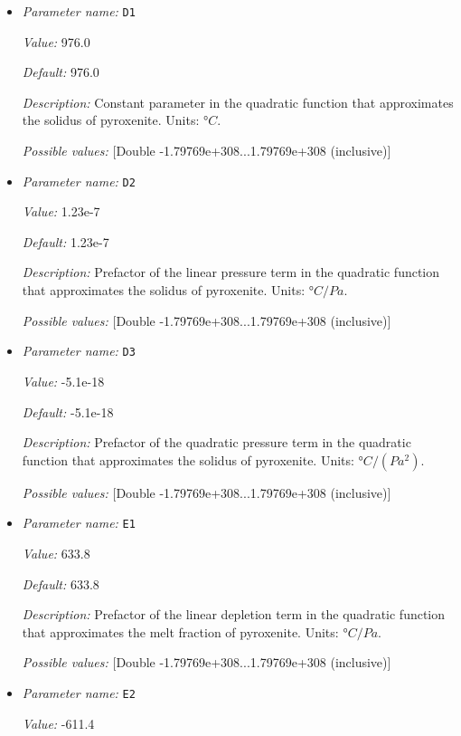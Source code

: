 \begin{itemize}
{\it Possible values:} [Double -1.79769e+308...1.79769e+308 (inclusive)]
\item {\it Parameter name:} {\tt D1}


{\it Value:} 976.0


{\it Default:} 976.0


{\it Description:} Constant parameter in the quadratic function that approximates the solidus of pyroxenite. Units: $°C$.


{\it Possible values:} [Double -1.79769e+308...1.79769e+308 (inclusive)]
\item {\it Parameter name:} {\tt D2}


{\it Value:} 1.23e-7


{\it Default:} 1.23e-7


{\it Description:} Prefactor of the linear pressure term in the quadratic function that approximates the solidus of pyroxenite. Units: $°C/Pa$.


{\it Possible values:} [Double -1.79769e+308...1.79769e+308 (inclusive)]
\item {\it Parameter name:} {\tt D3}


{\it Value:} -5.1e-18


{\it Default:} -5.1e-18


{\it Description:} Prefactor of the quadratic pressure term in the quadratic function that approximates the solidus of pyroxenite. Units: $°C/(Pa^2)$.


{\it Possible values:} [Double -1.79769e+308...1.79769e+308 (inclusive)]
\item {\it Parameter name:} {\tt E1}


{\it Value:} 633.8


{\it Default:} 633.8


{\it Description:} Prefactor of the linear depletion term in the quadratic function that approximates the melt fraction of pyroxenite. Units: $°C/Pa$.


{\it Possible values:} [Double -1.79769e+308...1.79769e+308 (inclusive)]
\item {\it Parameter name:} {\tt E2}


{\it Value:} -611.4



\end{itemize}
